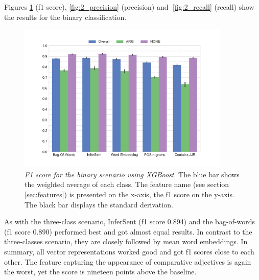 Figures \ref{fig:2_f1} (f1 score), \ref{fig:2_precision} (precision) and \ref{fig:2_recall} (recall) show the results for the binary classification.
\begin{figure}[h]
      \caption{\emph{F1 score for the binary scenario using XGBoost}. The blue bar shows the weighted average of each class. The feature name (see section \ref{sec:features}) is presented on the x-axis, the f1 score on the y-axis. The black bar displays the standard derivation.} 
    \label{fig:3_f1}

    \label{fig:2_f1}
 \centering
	\includegraphics[width=0.9\textwidth]{images/experiments/f1-True}

\end{figure}
As with the three-class scenario, InferSent (f1 score 0.894) and the bag-of-words (f1 score 0.890) performed best and got almost equal results. In contrast to the three-classes scenario, they are closely followed by mean word embeddings. In summary, all vector representations worked good and got f1 scores close to each other. The feature capturing the appearance of comparative adjectives is again the worst, yet the score is nineteen points above the baseline.



